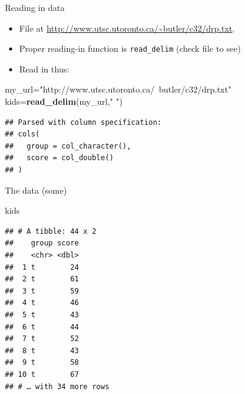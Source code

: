 \documentclass[ignorenonframetext,]{beamer}
\newenvironment{Shaded}{\begin{snugshade}}{\end{snugshade}}
\newcommand{\KeywordTok}[1]{\textcolor[rgb]{0.13,0.29,0.53}{\textbf{#1}}}
\newcommand{\NormalTok}[1]{#1}
\newcommand{\StringTok}[1]{\textcolor[rgb]{0.31,0.60,0.02}{#1}}
\providecommand{\tightlist}{%
  \setlength{\itemsep}{0pt}\setlength{\parskip}{0pt}}
\begin{document}
\begin{frame}[fragile]{Reading in data}
\protect\hypertarget{reading-in-data-1}{}

\begin{itemize}
\tightlist
\item
  File at \url{http://www.utsc.utoronto.ca/~butler/c32/drp.txt}.
\item
  Proper reading-in function is \texttt{read\_delim} (check file to see)
\item
  Read in thus:
\end{itemize}

\begin{Shaded}
\begin{Highlighting}[]
\NormalTok{my_url=}\StringTok{"http://www.utsc.utoronto.ca/~butler/c32/drp.txt"}
\NormalTok{kids=}\KeywordTok{read_delim}\NormalTok{(my_url,}\StringTok{" "}\NormalTok{)}
\end{Highlighting}
\end{Shaded}

\begin{verbatim}
## Parsed with column specification:
## cols(
##   group = col_character(),
##   score = col_double()
## )
\end{verbatim}

\end{frame}

\begin{frame}[fragile]{The data (some)}
\protect\hypertarget{the-data-some-1}{}

\begin{Shaded}
\begin{Highlighting}[]
\NormalTok{kids}
\end{Highlighting}
\end{Shaded}

\begin{verbatim}
## # A tibble: 44 x 2
##    group score
##    <chr> <dbl>
##  1 t        24
##  2 t        61
##  3 t        59
##  4 t        46
##  5 t        43
##  6 t        44
##  7 t        52
##  8 t        43
##  9 t        58
## 10 t        67
## # … with 34 more rows
\end{verbatim}

\end{frame}
\end{document}
